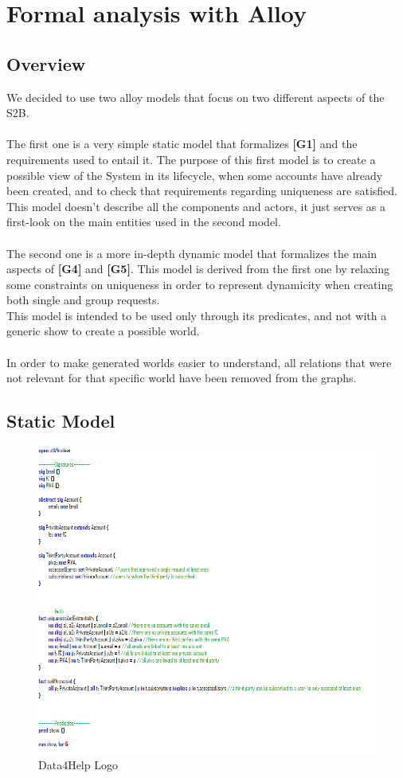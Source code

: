 \documentclass[titlepage]{article}
\begin{document}
	\section{Formal analysis with Alloy}
		
		\subsection{Overview}
		We decided to use two alloy models that focus on two different aspects of the S2B.\\
		\\
		The first one is a very simple static model that formalizes {\bf [G1]} and the requirements used to entail it. The 			purpose of this first model is to create a possible view of the System in its lifecycle, when some accounts have 			already been created, and to check that requirements regarding uniqueness are satisfied. \\
		This model doesn’t describe all the components and actors, it just serves as a first-look on the main entities used in 		the second model.\\
		\\
		The second one is a more in-depth dynamic model that formalizes the main aspects of {\bf [G4]} and {\bf [G5]}. This 		model is derived from the first one by relaxing some constraints on uniqueness in order to represent dynamicity 		when creating both single and group requests.\\
		This model is intended to be used only through its predicates, and not with a generic show to create a possible 		world.\\
		\\
		In order to make generated worlds easier to understand, all relations that were not relevant for that specific world 		have been removed from the graphs.\\
		
		\subsection{Static Model}
		\begin{figure}[ht]
			\center
  			\includegraphics[width=0.7\columnwidth]{Alloy/staticAlloy.png}
  			\caption{Data4Help Logo}
			\label{fig:staticAlloy}
		\end{figure}
		
\end{document}
